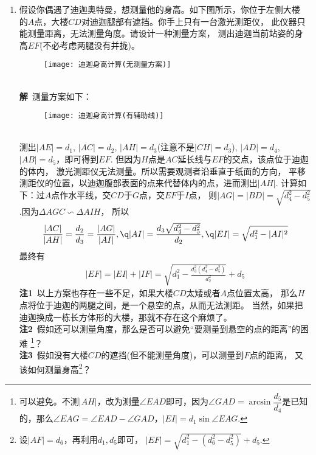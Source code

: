 \begin{enumerate}[label={【\textbf{例\thechapter.\arabic*}】},
 leftmargin=\inteval{\myenumleftmargin}pt,
 itemsep=\inteval{\myenumitempsep}pt,
 itemindent=\inteval{\myenumitemindent}pt]
\item 假设你偶遇了迪迦奥特曼，想测量他的身高。如下图所示，你位于左侧大楼
的$ A $点，大楼$ CD $对迪迦腿部有遮挡。你手上只有一台激光测距仪，
此仪器只能测量距离，无法测量角度。请设计一种测量方案，
测出迪迦当前站姿的身高$ EF $(不必考虑两腿没有并拢)。
\begin{figure}[h]
    \centering
    \texttt{[image: 迪迦身高计算(无测量方案)]}
\end{figure} \\
\textbf{解}\ 测量方案如下：
\begin{figure}[h]
    \centering
    \texttt{[image: 迪迦身高计算(有辅助线)]}
\end{figure} \\
测出$ |AE|=d_1 $, $ |AC|=d_2 $, $ |AH|=d_3 $(注意不是$ |CH|=d_3 $),
$ |AD|=d_4 $, $ |AB|=d_5 $，即可得到$ EF $.
但因为$ H $点是$ AC $延长线与$ EF $的交点，该点位于迪迦的体内，
激光测距仪无法测量。所以需要观测者沿垂直于纸面的方向，
平移测距仪的位置，以迪迦腹部表面的点来代替体内的点，进而测出$ |AH| $.
计算如下：过$ A $点作水平线，交$ CD $于$ G $点，交$ EF $于$ I $点，
则$ |AG|=|BD|=\sqrt{d_4^2-d_5^2} $.因为$ \Delta AGC \backsim \Delta AIH $，
所以
\begin{gather*}
    \dfrac{|AC|}{|AH|}=\dfrac{d_2}{d_3}=\dfrac{|AG|}{|AI|},\q  |AI|=\dfrac{d_3\sqrt{d_4^2-d_5^2} }{d_2},\q |EI|=\sqrt{d_1^2-|AI|^2}
\end{gather*}
最终有
\begin{gather*}
    |EF|=|EI|+|IF|=\sqrt{d_1^2-\frac{d_3^2(d_4^2-d_5^2)}{d_2^2}}+d_5
\end{gather*}
\textbf{注1}\ 以上方案也存在一些不足，如果大楼$ CD $太矮或者$ A $点位置太高，
那么$ H $点将位于迪迦的两腿之间，是一个悬空的点，从而无法测距。
当然，如果把迪迦换成一栋长方体形的大楼，那就不存在这个麻烦了。\\
\textbf{注2}\ 假如还可以测量角度，那么是否可以避免“要测量到悬空的点的距离”的困难
\footnote{可以避免。不测$ |AH| $，改为测量$ \angle EAD $即可，因为$ \angle 
    GAD=\arcsin\dfrac{d_5}{d_4} $是已知的，那么$ \angle EAG=\angle EAD-\angle 
    GAD $，$ |EI|=d_1\sin\angle EAG $. }？\\
\textbf{注3}\ 假如没有大楼$ CD $的遮挡(但不能测量角度)，可以测量到$ F $点的距离，
又该如何测量身高\footnote{设$ |AF|=d_6 $，再利用$ d_1,d_5 $即可，
    $ |EF|=\sqrt{d_1^2-(d_6^2-d_5^2)}+d_5 $. }？

\end{enumerate}

